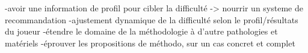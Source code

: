 	-avoir une information de profil pour cibler la difficulté -> nourrir un systeme de recommandation
	-ajustement dynamique de la difficulté selon le profil/résultats du joueur
	-étendre le domaine de la méthodologie à d'autre pathologies et matériels
	-éprouver les propositions de méthodo, sur un cas concret et complet